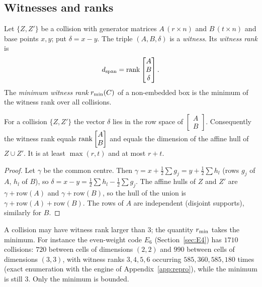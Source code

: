 \subsection{Witnesses and ranks}

\begin{definition}\label{def:witness}
Let $\{Z,Z'\}$ be a collision with generator matrices $A\,(r\times n)$ and $B\,(t\times n)$ and base points $x,y$; put $\delta=x-y$. The triple $(A,B,\delta)$ is a \emph{witness}. Its \emph{witness rank} is
\[
d_{\mathrm{span}}=\operatorname{rank}\begin{bmatrix}A\\ B\\ \delta\end{bmatrix}.
\]
The \emph{minimum witness rank} $r_{\min}(C)$ of a non-embedded box is the minimum of the witness rank over all collisions.
\end{definition}

\begin{lemma}\label{lem:rankspan}
For a collision $\{Z,Z'\}$ the vector $\delta$ lies in the row space of $\begin{bmatrix}A\\B\end{bmatrix}$. Consequently the witness rank equals $\operatorname{rank}\begin{bmatrix}A\\B\end{bmatrix}$ and equals the dimension of the affine hull of $Z\cup Z'$. It is at least $\max(r,t)$ and at most $r+t$.
\end{lemma}

\begin{proof}
Let $\gamma$ be the common centre. Then $\gamma=x+\tfrac12\sum g_j=y+\tfrac12\sum h_l$ (rows $g_j$ of $A$, $h_l$ of $B$), so $\delta=x-y=\tfrac12\sum h_l-\tfrac12\sum g_j$. The affine hulls of $Z$ and $Z'$ are $\gamma+\mathrm{row}(A)$ and $\gamma+\mathrm{row}(B)$, so the hull of the union is $\gamma+\mathrm{row}(A)+\mathrm{row}(B)$. The rows of $A$ are independent (disjoint supports), similarly for $B$.
\end{proof}

\begin{remark}\label{rem:individual}
A collision may have witness rank larger than $3$; the quantity $r_{\min}$ takes the minimum. For instance the even-weight code $E_6$ (Section~\ref{sec:E4}) has $1710$ collisions: $720$ between cells of dimensions $(2,2)$ and $990$ between cells of dimensions $(3,3)$, with witness ranks $3,4,5,6$ occurring $585,360,585,180$ times (exact enumeration with the engine of Appendix~\ref{app:repro}), while the minimum is still $3$. Only the minimum is bounded.
\end{remark}

